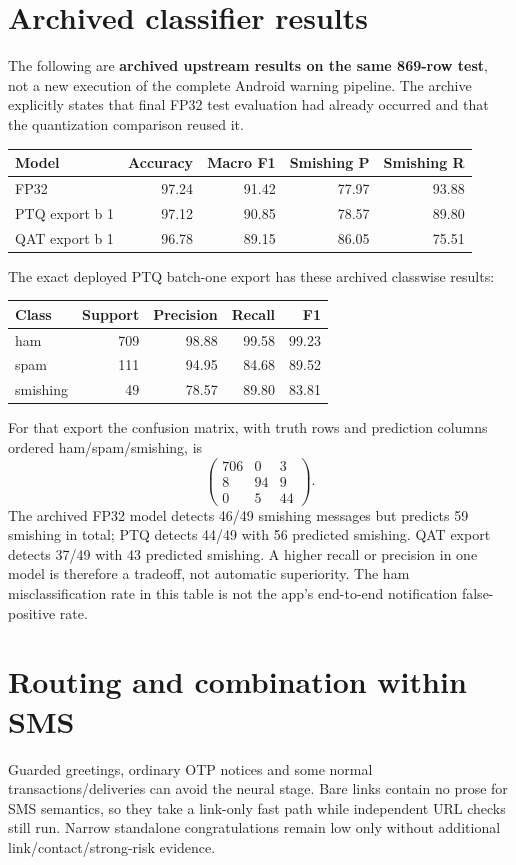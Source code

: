 \documentclass[11pt,a4paper,oneside]{report}
\begin{document}
\section{Archived classifier results}
The following are \textbf{archived upstream results on the same 869-row test}, not a new execution of the complete Android warning pipeline. The archive explicitly states that final FP32 test evaluation had already occurred and that the quantization comparison reused it.


{\small
\begin{longtable}{@{}lrrrr@{}}
\toprule
Model & Accuracy & Macro F1 & Smishing P & Smishing R\\\midrule\endhead
FP32 & 97.24 & 91.42 & 77.97 & 93.88\\
PTQ export b 1 & 97.12 & 90.85 & 78.57 & 89.80\\
QAT export b 1 & 96.78 & 89.15 & 86.05 & 75.51\\
\bottomrule\end{longtable}
}


The exact deployed PTQ batch-one export has these archived classwise results:


{\small
\begin{longtable}{@{}lrrrr@{}}
\toprule
Class & Support & Precision & Recall & F1\\\midrule\endhead
ham & 709 & 98.88 & 99.58 & 99.23\\
spam & 111 & 94.95 & 84.68 & 89.52\\
smishing & 49 & 78.57 & 89.80 & 83.81\\
\bottomrule\end{longtable}
}


For that export the confusion matrix, with truth rows and prediction columns ordered ham/spam/smishing, is
\[
\begin{pmatrix}706&0&3\\8&94&9\\0&5&44\end{pmatrix}.
\]
The archived FP32 model detects 46/49 smishing messages but predicts 59 smishing in total; PTQ detects 44/49 with 56 predicted smishing. QAT export detects 37/49 with 43 predicted smishing. A higher recall or precision in one model is therefore a tradeoff, not automatic superiority. The ham misclassification rate in this table is not the app's end-to-end notification false-positive rate.

\section{Routing and combination within SMS}
Guarded greetings, ordinary OTP notices and some normal transactions/deliveries can avoid the neural stage. Bare links contain no prose for SMS semantics, so they take a link-only fast path while independent URL checks still run. Narrow standalone congratulations remain low only without additional link/contact/strong-risk evidence.
\end{document}
